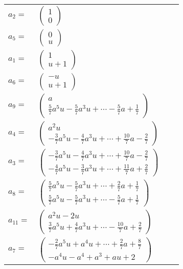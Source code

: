 \documentclass[1p]{elsarticle_modified}
\theoremstyle{definition}
\begin{document}
\begin{tabular}{m{7pt} m{180pt} m{7pt} m{180pt} }
\flushright $a_{2}=$&$\begin{pmatrix}1\\0\end{pmatrix}$ \\
\flushright $a_{5}=$&$\begin{pmatrix}0\\u\end{pmatrix}$ \\
\flushright $a_{1}=$&$\begin{pmatrix}1\\u+1\end{pmatrix}$ \\
\flushright $a_{6}=$&$\begin{pmatrix}- u\\u+1\end{pmatrix}$ \\
\flushright $a_{9}=$&$\begin{pmatrix}a\\\frac{5}{7} a^5 u-\frac{5}{7} a^3 u+\cdots-\frac{5}{7} a+\frac{1}{7}\end{pmatrix}$ \\
\flushright $a_{4}=$&$\begin{pmatrix}a^2 u\\-\frac{3}{7} a^5 u-\frac{4}{7} a^3 u+\cdots+\frac{10}{7} a-\frac{2}{7}\end{pmatrix}$ \\
\flushright $a_{3}=$&$\begin{pmatrix}-\frac{3}{7} a^5 u-\frac{4}{7} a^3 u+\cdots+\frac{10}{7} a-\frac{2}{7}\\-\frac{4}{7} a^5 u-\frac{3}{7} a^3 u+\cdots+\frac{11}{7} a+\frac{2}{7}\end{pmatrix}$ \\
\flushright $a_{8}=$&$\begin{pmatrix}\frac{5}{7} a^5 u-\frac{5}{7} a^3 u+\cdots+\frac{2}{7} a+\frac{1}{7}\\\frac{5}{7} a^5 u-\frac{5}{7} a^3 u+\cdots-\frac{5}{7} a+\frac{1}{7}\end{pmatrix}$ \\
\flushright $a_{11}=$&$\begin{pmatrix}a^2 u-2 u\\\frac{3}{7} a^5 u+\frac{4}{7} a^3 u+\cdots-\frac{10}{7} a+\frac{2}{7}\end{pmatrix}$ \\
\flushright $a_{7}=$&$\begin{pmatrix}-\frac{2}{7} a^5 u+a^4 u+\cdots+\frac{2}{7} a+\frac{8}{7}\\- a^4 u- a^4+a^3+a u+2\end{pmatrix}$ \\

\end{tabular}
\end{document}

